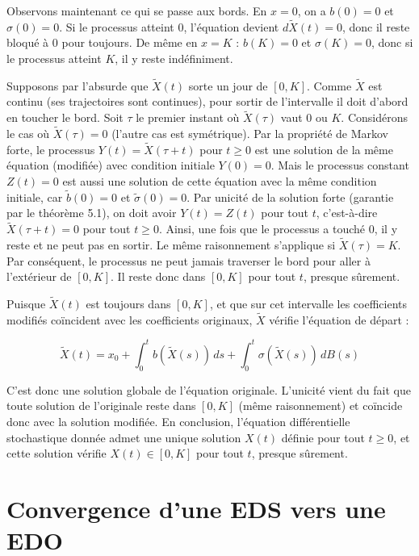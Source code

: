 \documentclass[12pt,a4paper]{article}
\theoremstyle{remark}
\begin{document}
Observons maintenant ce qui se passe aux bords. En \(x=0\), on a \(b(0)=0\) et \(\sigma(0)=0\). Si le processus atteint \(0\), l'équation devient \(d\tilde X(t)=0\), donc il reste bloqué à \(0\) pour toujours. De même en \(x=K\) : \(b(K)=0\) et \(\sigma(K)=0\), donc si le processus atteint \(K\), il y reste indéfiniment.

Supposons par l'absurde que \(\tilde X(t)\) sorte un jour de \([0,K]\). Comme \(\tilde X\) est continu (ses trajectoires sont continues), pour sortir de l'intervalle il doit d'abord en toucher le bord. Soit \(\tau\) le premier instant où \(\tilde X(\tau)\) vaut \(0\) ou \(K\). Considérons le cas où \(\tilde X(\tau)=0\) (l'autre cas est symétrique). Par la propriété de Markov forte, le processus \(Y(t)=\tilde X(\tau+t)\) pour \(t\ge0\) est une solution de la même équation (modifiée) avec condition initiale \(Y(0)=0\). Mais le processus constant \(Z(t)=0\) est aussi une solution de cette équation avec la même condition initiale, car \(\tilde b(0)=0\) et \(\tilde\sigma(0)=0\). Par unicité de la solution forte (garantie par le théorème 5.1), on doit avoir \(Y(t)=Z(t)\) pour tout \(t\), c'est-à-dire \(\tilde X(\tau+t)=0\) pour tout \(t\ge0\). Ainsi, une fois que le processus a touché \(0\), il y reste et ne peut pas en sortir. Le même raisonnement s'applique si \(\tilde X(\tau)=K\). Par conséquent, le processus ne peut jamais traverser le bord pour aller à l'extérieur de \([0,K]\). Il reste donc dans \([0,K]\) pour tout \(t\), presque sûrement.

Puisque \(\tilde X(t)\) est toujours dans \([0,K]\), et que sur cet intervalle les coefficients modifiés coïncident avec les coefficients originaux, \(\tilde X\) vérifie l'équation de départ :

\[
\tilde X(t) = x_0 + \int_0^t b(\tilde X(s))\,ds + \int_0^t \sigma(\tilde X(s))\,dB(s)
\]

C'est donc une solution globale de l'équation originale. L'unicité vient du fait que toute solution de l'originale reste dans \([0,K]\) (même raisonnement) et coïncide donc avec la solution modifiée. En conclusion, l'équation différentielle stochastique donnée admet une unique solution \(X(t)\) définie pour tout \(t\ge0\), et cette solution vérifie \(X(t)\in[0,K]\) pour tout \(t\), presque sûrement.

 
\section{Convergence d'une EDS vers une EDO}
 
\end{document}
